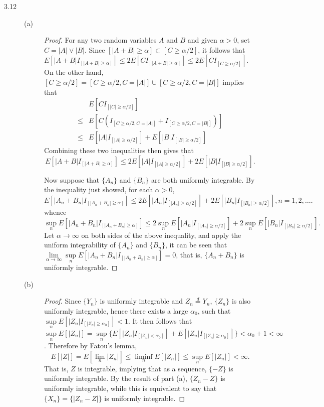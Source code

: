 \documentclass{article}
\theoremstyle{definition}
\theoremstyle{plain}
\theoremstyle{remark}
\begin{document}
\begin{description}
\item[3.12]
\begin{description}
\item[(a)]
\begin{proof}
For any two random variables $A$ and $B$ and given $\alpha > 0$, set $C = |A| \vee |B|$. Since $[|A + B| \geq \alpha] \subset [C \geq \alpha/2]$, it follows that $E[|A + B| I_{[|A + B| \geq \alpha]}] \leq 2E[CI_{[|A + B| \geq \alpha]}] \leq 2E[CI_{[C \geq \alpha/2]}]$. On the other hand, $[C \geq \alpha/2] = [C \geq \alpha/2, C = |A|] \cup [C \geq \alpha/2, C = |B|]$ implies that 
\begin{align*}
& E[CI_{[|C| \geq \alpha/2]}] \\
\leq & E[C(I_{[C \geq \alpha/2, C = |A|]} + I_{[C \geq \alpha/2, C = |B|]})] \\
\leq & E[|A|I_{[|A| \geq \alpha/2]}] + E[|B|I_{[|B| \geq \alpha/2]}] 
\end{align*}
Combining these two inequalities then gives that 
$$E[|A + B|I_{[|A + B| \geq \alpha]}] \leq 2E[|A|I_{[|A| \geq \alpha/2]}] + 2E[|B|I_{[|B| \geq \alpha/2]}].$$

Now suppose that $\{A_n\}$ and $\{B_n\}$ are both uniformly integrable. By the inequality just showed, for each $\alpha > 0$, 
$$E[|A_n + B_n|I_{[|A_n + B_n| \geq \alpha]}] \leq 2E[|A_n|I_{[|A_n| \geq \alpha/2]}] + 2E[|B_n|I_{[|B_n| \geq \alpha/2]}], n = 1, 2, \ldots.$$
whence 
$$\sup_n E[|A_n + B_n|I_{[|A_n + B_n| \geq \alpha]}] \leq 2\sup_n E[|A_n|I_{[|A_n| \geq \alpha/2]}] + 2\sup_n E[|B_n|I_{[|B_n| \geq \alpha/2]}].$$
Let $\alpha \to \infty$ on both sides of the above inequality, and apply the uniform integrability of $\{A_n\}$ and $\{B_n\}$, it can be seen that $\lim\limits_{\alpha \to \infty} \sup\limits_n E[|A_n + B_n|I_{[|A_n + B_n| \geq \alpha]}] = 0$, that is, $\{A_n + B_n\}$ is uniformly integrable.
\end{proof}

\item[(b)]
\begin{proof}
Since $\{Y_n\}$ is uniformly integrable and $Z_n \overset{d}= Y_n$, $\{Z_n\}$ is also uniformly integrable, hence there exists a large $\alpha_0$, such that $\sup\limits_n E[|Z_n|I_{[|Z_n| \geq \alpha_0]}] < 1$.
It then follows that $\sup\limits_n E[|Z_n|] = \sup\limits_n\{E[|Z_n|I_{[|Z_n| < \alpha_0]}] + E[|Z_n|I_{[|Z_n| \geq \alpha_0]}]\} < \alpha_0 + 1 < \infty$.
Therefore by Fatou's lemma,
$$E[|Z|] = E[\lim_n |Z_n|] \leq \liminf_n E[|Z_n|] \leq \sup_n E[|Z_n|] < \infty.$$
That is, $Z$ is integrable, implying that as a sequence, $\{-Z\}$ is uniformly integrable. By the result of part (a), $\{Z_n - Z\}$ is uniformly integrable, while this is equivalent to say that $\{X_n\} = \{|Z_n - Z|\}$ is uniformly integrable. 
\end{proof}


\end{description}
\end{description}
\end{document}
